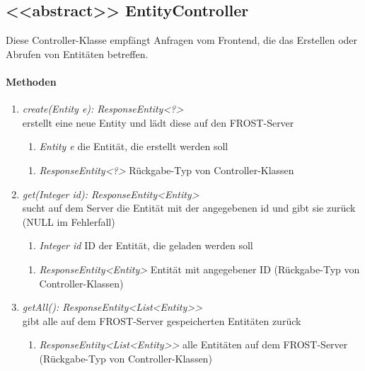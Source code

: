 \subsection*{<<abstract>> EntityController}\label{entCon}
Diese Controller-Klasse empfängt Anfragen vom Frontend, die das Erstellen oder Abrufen von Entitäten betreffen.

\paragraph{Methoden}

\begin{enumerate}[+]
	\item \textit{ create(Entity e): ResponseEntity<?> }\\
	erstellt eine neue Entity und lädt diese auf den FROST-Server
	
		\begin{enumerate}[$\bullet$]
			\item \textit{Entity e} die Entität, die erstellt werden soll

		\end{enumerate}
		\vspace{-0.2cm}
		\begin{enumerate}[$\circ$]
			\item \textit{ResponseEntity<?>} Rückgabe-Typ von Controller-Klassen
		\end{enumerate}
	
	\item \textit{ get(Integer id): ResponseEntity<Entity> }\\
	sucht auf dem Server die Entität mit der angegebenen id und gibt sie zurück (NULL im Fehlerfall)
	
		\begin{enumerate}[$\bullet$]
			\item \textit{Integer id} ID der Entität, die geladen werden soll
		
		\end{enumerate}
		\vspace{-0.2cm}
		\begin{enumerate}[$\circ$]
			\item \textit{ResponseEntity<Entity>} Entität mit angegebener ID (Rückgabe-Typ von Controller-Klassen)
		\end{enumerate}
	\item \textit{ getAll(): ResponseEntity<List<Entity>> }\\
	gibt alle auf dem FROST-Server gespeicherten Entitäten zurück
	
	\begin{enumerate}[$\circ$]
		\item \textit{ResponseEntity<List<Entity>>} alle Entitäten auf dem FROST-Server (Rückgabe-Typ von Controller-Klassen)
	\end{enumerate}


\end{enumerate}	
